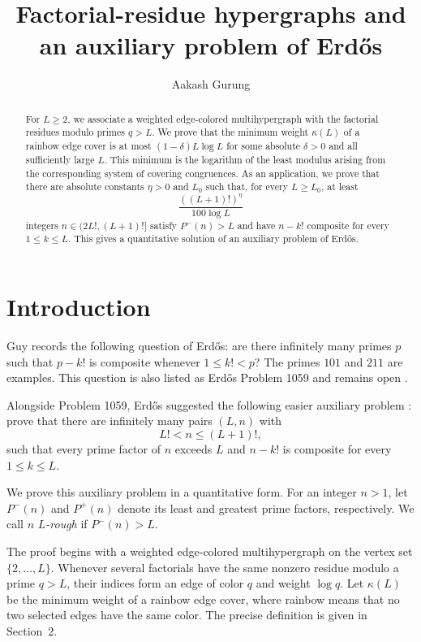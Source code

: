 \documentclass[11pt]{amsart}
\title[Factorial-residue hypergraphs]
{Factorial-residue hypergraphs and an auxiliary problem of Erd\H{o}s}
\author{Aakash Gurung}
\date{}
\theoremstyle{definition}
\theoremstyle{remark}
\begin{document}
\begin{abstract}
For $L\geq2$, we associate a weighted edge-colored multihypergraph with the
factorial residues modulo primes $q>L$.  We prove that the minimum weight
$\kappa(L)$ of a rainbow edge cover is at most $(1-\delta)L\log L$ for some
absolute $\delta>0$ and all sufficiently large $L$.  This minimum is the
logarithm of the least modulus arising from the corresponding system of
covering congruences.  As an application, we prove that there are absolute
constants $\eta>0$ and $L_0$ such that, for every $L\geq L_0$, at least
\[
\frac{((L+1)!)^\eta}{100\log L}
\]
integers $n\in(2L!,(L+1)!]$ satisfy $P^-(n)>L$ and have $n-k!$ composite
for every $1\leq k\leq L$.  This gives a quantitative solution of an
auxiliary problem of Erd\H{o}s.
\end{abstract}

\maketitle

\section{Introduction}

Guy \cite[Problem A2]{Guy} records the following question of Erd\H{o}s: are
there infinitely many primes $p$ such that $p-k!$ is composite whenever
$1\leq k!<p$?  The primes $101$ and $211$ are examples.  This question is
also listed as Erd\H{o}s Problem 1059 and remains open \cite{Bloom}.

Alongside Problem 1059, Erd\H{o}s suggested the following easier auxiliary
problem \cite[Problem A2]{Guy}: prove that there are infinitely many pairs
$(L,n)$ with
\[
L!<n\leq(L+1)!,
\]
such that every prime factor of $n$ exceeds $L$ and $n-k!$ is composite for
every $1\leq k\leq L$.

We prove this auxiliary problem in a quantitative form.  For an integer
$n>1$, let $P^-(n)$ and $P^+(n)$ denote its least and greatest prime factors,
respectively.  We call $n$ \emph{$L$-rough} if $P^-(n)>L$.

The proof begins with a weighted edge-colored multihypergraph on the vertex
set $\{2,\ldots,L\}$.  Whenever several factorials have the same nonzero
residue modulo a prime $q>L$, their indices form an edge of color $q$ and
weight $\log q$.  Let $\kappa(L)$ be the minimum weight of a rainbow edge
cover, where rainbow means that no two selected edges have the same color.
The precise definition is given in Section~2.
\end{document}
